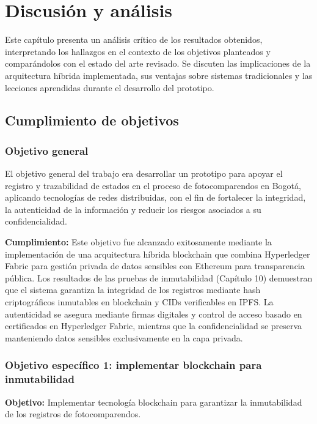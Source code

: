 \section{Discusión y análisis}

Este capítulo presenta un análisis crítico de los resultados obtenidos, interpretando los hallazgos en el contexto de los objetivos planteados y comparándolos con el estado del arte revisado. Se discuten las implicaciones de la arquitectura híbrida implementada, sus ventajas sobre sistemas tradicionales y las lecciones aprendidas durante el desarrollo del prototipo.

\subsection{Cumplimiento de objetivos}

\subsubsection{Objetivo general}

El objetivo general del trabajo era desarrollar un prototipo para apoyar el registro y trazabilidad de estados en el proceso de fotocomparendos en Bogotá, aplicando tecnologías de redes distribuidas, con el fin de fortalecer la integridad, la autenticidad de la información y reducir los riesgos asociados a su confidencialidad.

\textbf{Cumplimiento:} Este objetivo fue alcanzado exitosamente mediante la implementación de una arquitectura híbrida blockchain que combina Hyperledger Fabric para gestión privada de datos sensibles con Ethereum para transparencia pública. Los resultados de las pruebas de inmutabilidad (Capítulo 10) demuestran que el sistema garantiza la integridad de los registros mediante hash criptográficos inmutables en blockchain y CIDs verificables en IPFS. La autenticidad se asegura mediante firmas digitales y control de acceso basado en certificados en Hyperledger Fabric, mientras que la confidencialidad se preserva manteniendo datos sensibles exclusivamente en la capa privada.

\subsubsection{Objetivo específico 1: implementar blockchain para inmutabilidad}

\textbf{Objetivo:} Implementar tecnología blockchain para garantizar la inmutabilidad de los registros de fotocomparendos.

